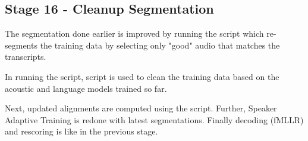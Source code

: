 \subsection{ Stage 16 - Cleanup Segmentation}
The segmentation done earlier is improved by running the script  which re-segments the training data by selecting only "good" audio that matches the transcripts.

In running the script,  script is used to clean the training data based on the acoustic and language models trained so far.

Next, updated alignments are computed using the  script. Further, Speaker Adaptive Training is redone with latest segmentations.
Finally decoding (fMLLR) and rescoring is like in the previous stage.